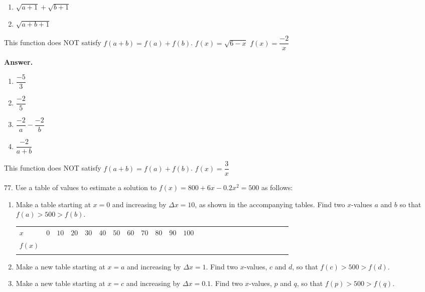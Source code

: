 \documentclass[10pt,]{book}
\theoremstyle{plain}
\theoremstyle{definition}
\theoremstyle{definition}
\theoremstyle{definition}
\theoremstyle{definition}
\numberwithin{equation}{part}
\newcommand{\hrulethin}  {\noalign{\hrule height 0.04em}}
\newcommand{\hrulethick} {\noalign{\hrule height 0.11em}}
\newcommand{\gt}{>}
\begin{document}
\begin{exerciselist}
\begin{exercisegroup}
\begin{multicols}{2}
\begin{enumerate}[label=\alph*]
\item\hypertarget{li-576}{}\(\sqrt{a+1}+\sqrt{b+1} \)%
\item\hypertarget{li-577}{}\(\sqrt{a+b+1} \)%
\end{enumerate}
\end{multicols}
 This function does NOT satisfy \(f (a + b) = f (a) + f (b)\).%
\exercise[74.]\hypertarget{exercise-143}{}\(f (x) = \sqrt{6-x}\)%
\exercise[75.]\hypertarget{exercise-144}{}\(f (x) =\dfrac{-2}{x} \)%
\par\smallskip
\noindent\textbf{Answer.}\hypertarget{answer-81}{}\quad
\leavevmode%
\begin{multicols}{2}
\begin{enumerate}[label=\alph*]
\item\hypertarget{li-578}{}\(\dfrac{-5}{3} \)%
\item\hypertarget{li-579}{}\(\dfrac{-2}{5} \)%
\item\hypertarget{li-580}{}\(\dfrac{-2}{a}-\dfrac{-2}{b} \)%
\item\hypertarget{li-581}{}\(\dfrac{-2}{a+b} \)%
\end{enumerate}
\end{multicols}
 This function does NOT satisfy \(f (a + b) = f (a) + f (b)\).%
\exercise[76.]\hypertarget{exercise-145}{}\(f (x) = \dfrac{3}{x}\)%
\end{exercisegroup}
\par\smallskip\noindent
\item[77.]\hypertarget{exercise-146}{}Use a table of values to estimate a solution to \(f (x) = 800 + 6x - 0.2x^2 = 500\) as follows: \leavevmode%
\begin{enumerate}[label=\alph*]
\item\hypertarget{li-582}{}Make a table starting at \(x = 0\) and increasing by \(\Delta x = 10\), as shown in the accompanying tables. Find two \(x\)-values \(a\) and \(b\) so that \(f (a)\gt 500\gt f (b)\). \begin{tabular}{AcAcAcAcAcAcAcAcAcAcAcAcA}\hrulethick
\(x\)&\(0\)&\(10\)&\(20\)&\(30\)&\(40\)&\(50\)&\(60\)&\(70\)&\(80\)&\(90\)&\(100\)\tabularnewline\hrulethin
\(f(x)\)&\(\)&\(\)&\(\)&\(\)&\(\)&\(\)&\(\)&\(\)&\(\)&\(\)&\(\)\tabularnewline\hrulethin
\end{tabular}
%
\item\hypertarget{li-583}{}Make a new table starting at \(x = a\) and increasing by \(\Delta x = 1\). Find two \(x\)-values, \(c\) and \(d\), so that \(f (c)\gt 500\gt f (d)\).%
\item\hypertarget{li-584}{}Make a new table starting at \(x = c\) and increasing by \(\Delta x = 0.1\). Find two \(x\)-values, \(p\) and \(q\), so that \(f (p)\gt 500\gt f (q)\).%

\end{enumerate}
\end{exerciselist}
\end{document}
